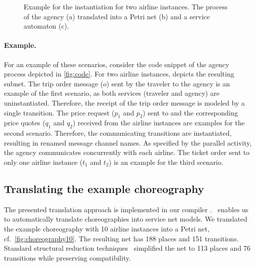 \begin{figure}%
\centering
{}
\hfill
{}
\caption{Example for the instantiation for two airline instances. The  process of the agency (a) translated into a Petri net (b) and a service automaton (c). }
\label{fig:instantiation}
\end{figure}


\paragraph{Example.}

For an example of these scenarios, consider the  code snippet of the agency process depicted in \autoref{fig:code}. For two airline instances,  depicts the resulting subnet. The trip order message ($o$) sent by the traveler to the agency is an example of the first scenario, as both services (traveler and agency) are uninstantiated. Therefore, the receipt of the trip order message is modeled by a single transition. The price request ($p_{1}$ and $p_{2}$) sent to and the corresponding price quotes ($q_{1}$ and $q_{2}$) received from the airline instances are examples for the second scenario. Therefore, the communicating transitions are instantiated, resulting in renamed message channel names. As specified by the parallel  activity, the agency communicates concurrently with each airline. The ticket order sent to only one airline instance ($t_{1}$ and $t_{2}$) is an example for the third scenario.




\subsection*{Translating the example choreography}

The presented translation approach is implemented in our compiler \bpelowfn{} \cite{Lohmann_2007_hubtr212}. \bpelowfn\ enables us to automatically translate  choreographies into service net models. We translated the example choreography with 10 airline instances into a Petri net, cf.~\autoref{fig:choreography10}. The resulting net has 188 places and 151 transitions. Standard structural reduction techniques~\cite{Murata_1989_pieee} simplified the net to 113 places and 76 transitions while preserving compatibility.

